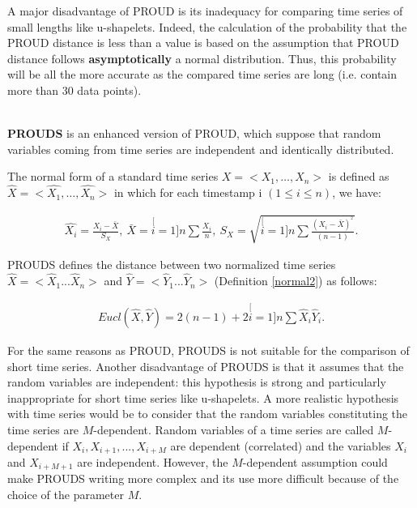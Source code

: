 A major disadvantage of PROUD is its inadequacy for comparing time series of small lengths like u-shapelets. Indeed, the calculation of the probability that the PROUD distance is less than a value is based on the assumption that PROUD distance follows \textbf{asymptotically} a normal distribution.  Thus, this probability will be all the more accurate as the compared time series are long (i.e. contain more than 30 data points).

\\
\textbf{PROUDS}\cite{Orang2015} is an enhanced version of PROUD, which suppose that random variables coming from time series are independent and
identically distributed. 


\begin{definition}
\label{normal}
The normal form of a standard time series $X = <X_1, \ldots, X_n>$ is defined as
$\hat{X}=<\hat{X_{1}},\ldots,\hat{X_{n}}>$ in which for each timestamp i $(1 \leq i \leq n)$, we have:

\begin{eqnarray}
\hat{X_{i}}=\frac{X_{i}-\bar{X}}{S_{X}},\:\bar{X}=\stackrel[i=1]{n}{\sum}\frac{X_{i}}{n},\:S_{X}=\sqrt{\stackrel[i=1]{n}{\sum}\frac{(X_{i}-\bar{X})^{^{2}}}{(n-1)}}.
\end{eqnarray}
\label{normal2}
\end{definition}



PROUDS defines the distance between two normalized time series  $\hat{X}=<\hat{X}_{1}...\hat{X}_{n}>$ and $\hat{Y}=<\hat{Y}_{1}...\hat{Y}_{n}>$ (Definition \ref{normal2}) as follows:

\begin{eqnarray}
Eucl(\hat{X},\hat{Y})=2(n-1)+2\stackrel[i=1]{n}{\sum}\hat{X}_{i}\hat{Y}_{i}.
\end{eqnarray}

For the same reasons as PROUD, PROUDS is not suitable for the comparison of short time series. Another disadvantage of PROUDS is that it assumes that the random variables  are independent: this hypothesis is strong and particularly inappropriate for short time series like u-shapelets. A more realistic hypothesis with time series would be to consider that the random variables constituting the time series are $M$-dependent. Random variables of a time series are called $M$-dependent
 if $X_{i},X_{i+1},...,X_{i+M}$ are dependent (correlated) and the
variables $X_{i}$ and $X_{i+M+1}$ are independent. However, the $M$-dependent assumption could make PROUDS writing more complex and its use more difficult because of the choice of the parameter $M$. 

